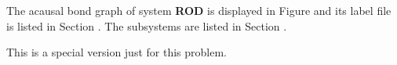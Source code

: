 

   The acausal bond graph of system \textbf{ROD} is
   displayed in Figure  and its label
   file is listed in Section .
   The subsystems are listed in Section .


This is a special version just for this problem.
